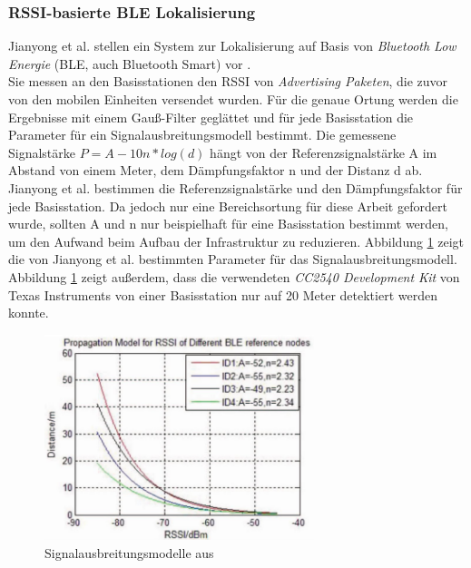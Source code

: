 \subsubsection{RSSI-basierte BLE Lokalisierung}
Jianyong et al. stellen ein System zur Lokalisierung auf Basis von \emph{Bluetooth Low Energie} (BLE, auch Bluetooth Smart) vor \cite{jianyong2014rssi}. \\
Sie messen an den Basisstationen den RSSI von \emph{Advertising Paketen}, die zuvor von den mobilen Einheiten versendet wurden.
Für die genaue Ortung werden die Ergebnisse mit einem Gauß-Filter geglättet und für jede Basisstation die Parameter für ein Signalausbreitungsmodell bestimmt.
Die gemessene Signalstärke $P = A - 10n*log(d)$ hängt von der Referenzsignalstärke A im Abstand von einem Meter, dem Dämpfungsfaktor n und der Distanz d ab. \\
Jianyong et al. bestimmen die Referenzsignalstärke und den Dämpfungsfaktor für jede Basisstation.
Da jedoch nur eine Bereichsortung für diese Arbeit gefordert wurde, sollten A und n nur beispielhaft für eine Basisstation bestimmt werden, um den Aufwand beim Aufbau der Infrastruktur zu reduzieren.
Abbildung \ref{fig:blemodel} zeigt die von Jianyong et al. bestimmten Parameter für das Signalausbreitungsmodell. 
Abbildung \ref{fig:blemodel} zeigt außerdem, dass die verwendeten \emph{CC2540 Development Kit} von Texas Instruments von einer Basisstation nur auf 20 Meter detektiert werden konnte.


\begin{figure}[h]
  \centering
	\includegraphics[width=0.7\textwidth]{images/blemodel.png}
  \caption{Signalausbreitungsmodelle aus \cite{jianyong2014rssi}}
  \label{fig:blemodel}
\end{figure}

